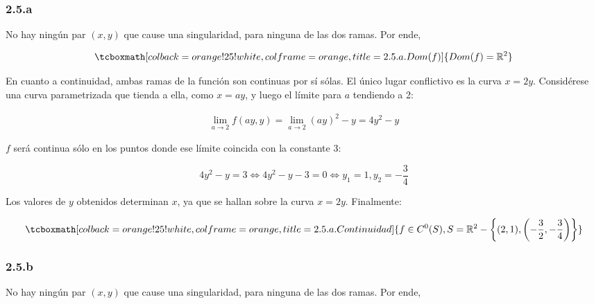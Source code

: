 \documentclass{article}
\renewcommand{\Bbb}{\mathbb}
\begin{document}
\subsubsection*{2.5.a}
\label{subsubsec:2.5.a}

No hay ningún par $(x,y)$ que cause una singularidad, para ninguna de las dos ramas. Por ende,

\begin{equation}
\tcboxmath[colback=orange!25!white,colframe=orange,title=2.5.a. Dom(f) ]
{ \mathop{Dom}(f) = \Bbb R^2 }
\end{equation}

En cuanto a continuidad, ambas ramas de la función son continuas por sí sólas. El único lugar conflictivo es la curva $x = 2y$. Considérese una curva parametrizada que tienda a ella, como $x = ay$, y luego el límite para $a$ tendiendo a 2:

\begin{subequations}
\begin{align}
\lim_{a \rightarrow 2} f(ay, y) = \lim_{a \rightarrow 2} (ay)^2 - y = 4y^2 - y
\end{align}
\end{subequations}

$f$ será continua sólo en los puntos donde ese límite coincida con la constante $3$:

\begin{equation}
4y^2 - y = 3 \Leftrightarrow 4y^2 - y - 3 = 0 \Leftrightarrow y_1 = 1, y_2 = -\frac{3}{4}
\end{equation}

Los valores de $y$ obtenidos determinan $x$, ya que se hallan sobre la curva $x = 2y$. Finalmente:

\begin{equation}
\tcboxmath[colback=orange!25!white,colframe=orange,title=2.5.a. Continuidad ]
{ f \in C^0(S), S = \Bbb R^2 - \left\{ (2, 1), \left(-\frac{3}{2}, -\frac{3}{4} \right) \right\} }
\end{equation}

\subsubsection*{2.5.b}
\label{subsubsec:2.5.b}

No hay ningún par $(x,y)$ que cause una singularidad, para ninguna de las dos ramas. Por ende,
\end{document}

